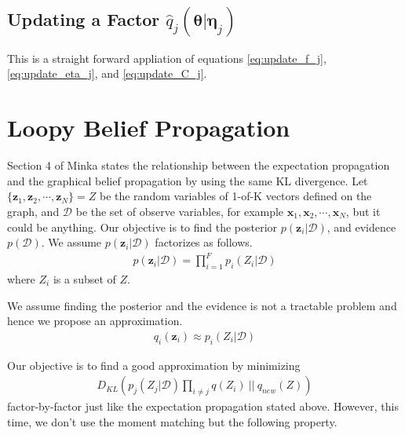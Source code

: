 \documentclass[a4]{article}
\begin{document}
\subsection {Updating a Factor $\hat{q}_j(\bm{\theta}|\bm{\eta}_j)$}
This is a straight forward appliation of equations
\ref{eq:update_f_j}, \ref{eq:update_eta_j}, and \ref{eq:update_C_j}.

\section{Loopy Belief Propagation}
Section 4 of Minka\cite{minka2001} states the relationship between the expectation propagation
and the graphical belief propagation by using the same KL divergence.
Let $\{\bm{z}_1, \bm{z}_2, \cdots,  \bm{z}_N\}=Z$ be the random variables of 1-of-K vectors defined on the graph, and
$\mathcal{D}$ be the set of observe variables, for example $\bm{x}_1, \bm{x}_2, \cdots,  \bm{x}_N$,
but it could be anything.
Our objective is to find the posterior $p(\bm{z}_i|\mathcal{D})$, and evidence $p(\mathcal{D})$.
We assume $p(\bm{z}_i|\mathcal{D})$ factorizes as follows.
\begin{equation}
\begin{aligned}
p(\bm{z}_i|\mathcal{D}) = \prod_{i=1}^F p_i(Z_i|\mathcal{D})
\end{aligned}
\end{equation}
where $Z_i$ is a subset of $Z$.

We assume finding the posterior and the evidence is not a tractable problem and hence we propose an approximation.
\begin{equation}
\begin{aligned}
q_i(\bm{z}_i) \approx p_i(Z_i|\mathcal{D})
\end{aligned}
\end{equation}

Our objective is to find a good approximation by minimizing 
\begin{equation}
\begin{aligned}
D_{KL}\left(p_j(Z_j|\mathcal{D})\prod_{i \ne j}q(Z_i)\:\Big|\Big|\:q_{new}(Z)\right)
\end{aligned}
\end{equation}
factor-by-factor just like the expectation propagation stated above.
However, this time, we don't use the moment matching but the following property.
\end{document}

